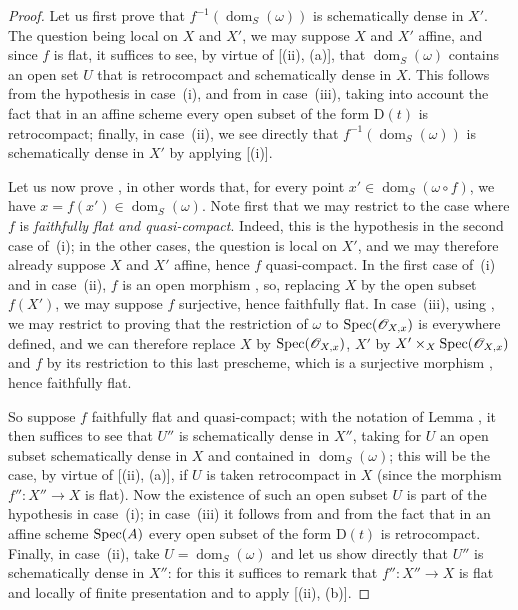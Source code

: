 \begin{proof}
Let us first prove that $f^{-1}(\operatorname{dom}_S(\omega))$ is schematically dense in $X'$.
The question being local on $X$ and $X'$, we may suppose $X$ and $X'$ affine, and since $f$ is flat, it suffices to see, by virtue of [(ii), (a)], that $\operatorname{dom}_S(\omega)$ contains an open set $U$ that is retrocompact and schematically dense in $X$.
This follows from the hypothesis in case~(i), and from  in case~(iii), taking into account the fact that in an affine scheme every open subset of the form $\mathrm{D}(t)$ is retrocompact; finally, in case~(ii), we see directly that $f^{-1}(\operatorname{dom}_S(\omega))$ is schematically dense in $X'$ by applying [(i)].

Let us now prove , in other words that, for every point $x'\in\operatorname{dom}_S(\omega\circ f)$, we have $x=f(x')\in\operatorname{dom}_S(\omega)$.
Note first that we may restrict to the case where $f$ is \emph{faithfully flat and quasi-compact}.
Indeed, this is the hypothesis in the second case of~(i); in the other cases, the question is local on $X'$, and we may therefore already suppose $X$ and $X'$ affine, hence $f$ quasi-compact.
In the first case of~(i) and in case~(ii), $f$ is an open morphism , so, replacing $X$ by the open subset $f(X')$, we may suppose $f$ surjective, hence faithfully flat.
In case~(iii), using , we may restrict to proving that the restriction of $\omega$ to $\operatorname{Spec}(\mathscr{O}_{X,x})$ is everywhere defined, and we can therefore replace $X$ by $\operatorname{Spec}(\mathscr{O}_{X,x})$, $X'$ by $X'\times_X\operatorname{Spec}(\mathscr{O}_{X,x})$ and $f$ by its restriction to this last prescheme, which is a surjective morphism , hence faithfully flat.

So suppose $f$ faithfully flat and quasi-compact; with the notation of Lemma , it then suffices to see that $U''$ is schematically dense in $X''$, taking for $U$ an open subset schematically dense in $X$ and contained in $\operatorname{dom}_S(\omega)$; this will be the case, by virtue of [(ii), (a)], if $U$ is taken retrocompact in $X$ (since the morphism $f'':X''\to X$ is flat).
Now the existence of such an open subset $U$ is part of the hypothesis in case~(i); in case~(iii) it follows from  and from the fact that in an affine scheme $\operatorname{Spec}(A)$ every open subset of the form $\mathrm{D}(t)$ is retrocompact.
Finally, in case~(ii), take $U=\operatorname{dom}_S(\omega)$ and let us show directly that $U''$ is schematically dense in $X''$: for this it suffices to remark that $f'':X''\to X$ is flat and locally of finite presentation and to apply [(ii), (b)].
\end{proof}

